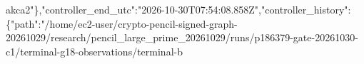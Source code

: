 \documentclass[10pt]{article}
\begin{document}
ak{}c\allowbreak{}a\allowbreak{}2\allowbreak{}"\allowbreak{}\}\allowbreak{},\allowbreak{}"\allowbreak{}c\allowbreak{}o\allowbreak{}n\allowbreak{}t\allowbreak{}r\allowbreak{}o\allowbreak{}l\allowbreak{}l\allowbreak{}e\allowbreak{}r\allowbreak{}\_\allowbreak{}e\allowbreak{}n\allowbreak{}d\allowbreak{}\_\allowbreak{}u\allowbreak{}t\allowbreak{}c\allowbreak{}"\allowbreak{}:\allowbreak{}"\allowbreak{}2\allowbreak{}0\allowbreak{}2\allowbreak{}6\allowbreak{}-\allowbreak{}1\allowbreak{}0\allowbreak{}-\allowbreak{}3\allowbreak{}0\allowbreak{}T\allowbreak{}0\allowbreak{}7\allowbreak{}:\allowbreak{}5\allowbreak{}4\allowbreak{}:\allowbreak{}0\allowbreak{}8\allowbreak{}.\allowbreak{}8\allowbreak{}5\allowbreak{}8\allowbreak{}Z\allowbreak{}"\allowbreak{},\allowbreak{}"\allowbreak{}c\allowbreak{}o\allowbreak{}n\allowbreak{}t\allowbreak{}r\allowbreak{}o\allowbreak{}l\allowbreak{}l\allowbreak{}e\allowbreak{}r\allowbreak{}\_\allowbreak{}h\allowbreak{}i\allowbreak{}s\allowbreak{}t\allowbreak{}o\allowbreak{}r\allowbreak{}y\allowbreak{}"\allowbreak{}:\allowbreak{}\{\allowbreak{}"\allowbreak{}p\allowbreak{}a\allowbreak{}t\allowbreak{}h\allowbreak{}"\allowbreak{}:\allowbreak{}"\allowbreak{}/\allowbreak{}h\allowbreak{}o\allowbreak{}m\allowbreak{}e\allowbreak{}/\allowbreak{}e\allowbreak{}c\allowbreak{}2\allowbreak{}-\allowbreak{}u\allowbreak{}s\allowbreak{}e\allowbreak{}r\allowbreak{}/\allowbreak{}c\allowbreak{}r\allowbreak{}y\allowbreak{}p\allowbreak{}t\allowbreak{}o\allowbreak{}-\allowbreak{}p\allowbreak{}e\allowbreak{}n\allowbreak{}c\allowbreak{}i\allowbreak{}l\allowbreak{}-\allowbreak{}s\allowbreak{}i\allowbreak{}g\allowbreak{}n\allowbreak{}e\allowbreak{}d\allowbreak{}-\allowbreak{}g\allowbreak{}r\allowbreak{}a\allowbreak{}p\allowbreak{}h\allowbreak{}-\allowbreak{}2\allowbreak{}0\allowbreak{}2\allowbreak{}6\allowbreak{}1\allowbreak{}0\allowbreak{}2\allowbreak{}9\allowbreak{}/\allowbreak{}r\allowbreak{}e\allowbreak{}s\allowbreak{}e\allowbreak{}a\allowbreak{}r\allowbreak{}c\allowbreak{}h\allowbreak{}/\allowbreak{}p\allowbreak{}e\allowbreak{}n\allowbreak{}c\allowbreak{}i\allowbreak{}l\allowbreak{}\_\allowbreak{}l\allowbreak{}a\allowbreak{}r\allowbreak{}g\allowbreak{}e\allowbreak{}\_\allowbreak{}p\allowbreak{}r\allowbreak{}i\allowbreak{}m\allowbreak{}e\allowbreak{}\_\allowbreak{}2\allowbreak{}0\allowbreak{}2\allowbreak{}6\allowbreak{}1\allowbreak{}0\allowbreak{}2\allowbreak{}9\allowbreak{}/\allowbreak{}r\allowbreak{}u\allowbreak{}n\allowbreak{}s\allowbreak{}/\allowbreak{}p\allowbreak{}1\allowbreak{}8\allowbreak{}6\allowbreak{}3\allowbreak{}7\allowbreak{}9\allowbreak{}-\allowbreak{}g\allowbreak{}a\allowbreak{}t\allowbreak{}e\allowbreak{}-\allowbreak{}2\allowbreak{}0\allowbreak{}2\allowbreak{}6\allowbreak{}1\allowbreak{}0\allowbreak{}3\allowbreak{}0\allowbreak{}-\allowbreak{}c\allowbreak{}1\allowbreak{}/\allowbreak{}t\allowbreak{}e\allowbreak{}r\allowbreak{}m\allowbreak{}i\allowbreak{}n\allowbreak{}a\allowbreak{}l\allowbreak{}-\allowbreak{}g\allowbreak{}1\allowbreak{}8\allowbreak{}-\allowbreak{}o\allowbreak{}b\allowbreak{}s\allowbreak{}e\allowbreak{}r\allowbreak{}v\allowbreak{}a\allowbreak{}t\allowbreak{}i\allowbreak{}o\allowbreak{}n\allowbreak{}s\allowbreak{}/\allowbreak{}t\allowbreak{}e\allowbreak{}r\allowbreak{}m\allowbreak{}i\allowbreak{}n\allowbreak{}a\allowbreak{}l\allowbreak{}-\allowbreak{}b\allo
\end{document}
